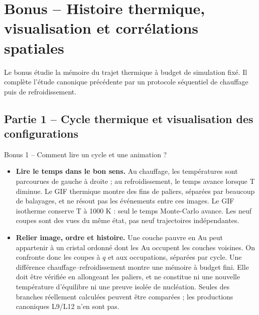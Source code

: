 \documentclass[10pt,a4paper]{article}
\begin{document}
\section{Bonus -- Histoire thermique, visualisation et corrélations spatiales}
\label{sec:bonus-cycle}
Le bonus étudie la mémoire du trajet thermique à budget de simulation
fixé. Il complète l'étude canonique précédente par un protocole
séquentiel de chauffage puis de refroidissement.
\subsection{Partie 1 -- Cycle thermique et visualisation des configurations}
\begingroup\sloppy
{}
\begin{oral}{Bonus 1 -- Comment lire un cycle et une animation ?}
\begin{itemize}
\item \textbf{Lire le temps dans le bon sens.} Au chauffage, les
températures sont parcourues de gauche à droite ; au refroidissement,
le temps avance lorsque T diminue. Le GIF thermique montre des fins
de paliers, séparées par beaucoup de balayages, et ne résout pas les
événements entre ces images. Le GIF isotherme conserve T à 1000 K :
seul le temps Monte-Carlo avance. Les neuf coupes sont des vues du même
état, pas neuf trajectoires indépendantes.
\item \textbf{Relier image, ordre et histoire.} Une couche pauvre en Au
peut appartenir à un cristal ordonné dont les Au occupent les couches
voisines. On confronte donc les coupes à $q$ et aux occupations, séparées
par cycle. Une différence chauffage--refroidissement montre une mémoire
à budget fini. Elle doit être vérifiée en allongeant les paliers, et
ne constitue ni une nouvelle température d'équilibre ni une preuve
isolée de nucléation. Seules des branches réellement calculées peuvent
être comparées ; les productions canoniques L9/L12 n'en sont pas.
\end{itemize}
\end{oral}
\end{document}
